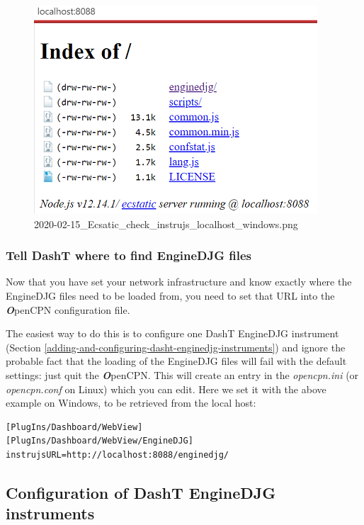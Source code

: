 \documentclass[11pt]{article}
\begin{document}
    \begin{figure}
\centering
\includegraphics{2020-02-15_Ecsatic_check_instrujs_localhost_windows.png}
\caption{2020-02-15\_Ecsatic\_check\_instrujs\_localhost\_windows.png}
\end{figure}

    \hypertarget{tell-dasht-where-to-find-enginedjg-files}{%
\subsubsection{Tell DashT where to find EngineDJG
files}\label{tell-dasht-where-to-find-enginedjg-files}}

    Now that you have set your network infrastructure and know exactly where
the EngineDJG files need to be loaded from, you need to set that URL
into the \textbf{\emph{O}}penCPN configuration file.

    The easiest way to do this is to configure one DashT EngineDJG
instrument
(Section \ref{adding-and-configuring-dasht-enginedjg-instruments}) and
ignore the probable fact that the loading of the EngineDJG files will
fail with the default settings: just quit the \textbf{\emph{O}}penCPN.
This will create an entry in the \emph{opencpn.ini} (or
\emph{opencpn.conf} on Linux) which you can edit. Here we set it with
the above example on Windows, to be retrieved from the local host:

    \begin{verbatim}
[PlugIns/Dashboard/WebView]
[PlugIns/Dashboard/WebView/EngineDJG]
instrujsURL=http://localhost:8088/enginedjg/
\end{verbatim}

    \hypertarget{configuration-of-dasht-enginedjg-instruments}{%
\subsection{Configuration of DashT EngineDJG
instruments}\label{configuration-of-dasht-enginedjg-instruments}}
\end{document}
